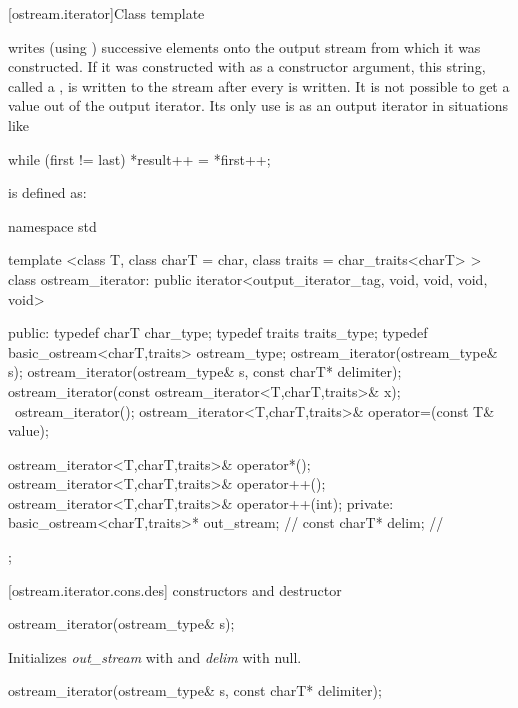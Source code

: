 [ostream.iterator]{Class template }

\pnum
{}%
writes (using
)
successive elements onto the output stream from which it was constructed.
If it was constructed with
as a constructor argument, this string, called a
,
is written to the stream after every
is written.
It is not possible to get a value out of the output iterator.
Its only use is as an output iterator in situations like

\begin{codeblock}
while (first != last)
  *result++ = *first++;
\end{codeblock}

\pnum
{}
is defined as:

\begin{codeblock}
namespace std {
  template <class T, class charT = char, class traits = char_traits<charT> >
  class ostream_iterator:
    public iterator<output_iterator_tag, void, void, void, void> {
  public:
    typedef charT char_type;
    typedef traits traits_type;
    typedef basic_ostream<charT,traits> ostream_type;
    ostream_iterator(ostream_type& s);
    ostream_iterator(ostream_type& s, const charT* delimiter);
    ostream_iterator(const ostream_iterator<T,charT,traits>& x);
   ~ostream_iterator();
    ostream_iterator<T,charT,traits>& operator=(const T& value);

    ostream_iterator<T,charT,traits>& operator*();
    ostream_iterator<T,charT,traits>& operator++();
    ostream_iterator<T,charT,traits>& operator++(int);
  private:
    basic_ostream<charT,traits>* out_stream;  // \expos
    const charT* delim;                       // \expos
  };
}
\end{codeblock}

[ostream.iterator.cons.des]{ constructors and destructor}


%
\begin{itemdecl}
ostream_iterator(ostream_type& s);
\end{itemdecl}

\begin{itemdescr}
\pnum
\effects
Initializes \textit{out_stream} with  and \textit{delim} with null.
\end{itemdescr}


%
\begin{itemdecl}
ostream_iterator(ostream_type& s, const charT* delimiter);
\end{itemdecl}

